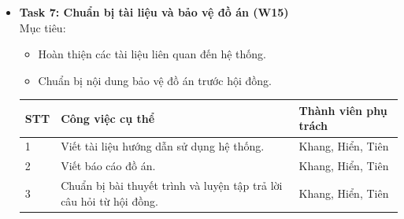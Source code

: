 \begin{itemize}
\item\textbf{Task 7: Chuẩn bị tài liệu và bảo vệ đồ án (W15)}\\
\indent Mục tiêu:
\begin{itemize}
    \item Hoàn thiện các tài liệu liên quan đến hệ thống.
    \item Chuẩn bị nội dung bảo vệ đồ án trước hội đồng.
\end{itemize}
\begin{table}[H]
    \centering
    \begin{tabular}{|p{1cm}|p{8cm}|p{4cm}|}
        \hline
        \textbf{STT} & \textbf{Công việc cụ thể} & \textbf{Thành viên phụ trách} \\
        \hline
        1 & Viết tài liệu hướng dẫn sử dụng hệ thống. & Khang, Hiển, Tiên \\
        \hline
        2 & Viết báo cáo đồ án. & Khang, Hiển, Tiên \\
        \hline
        3 & Chuẩn bị bài thuyết trình và luyện tập trả lời câu hỏi từ hội đồng. & Khang, Hiển, Tiên \\
        \hline
    \end{tabular}
\end{table}


\end{itemize}